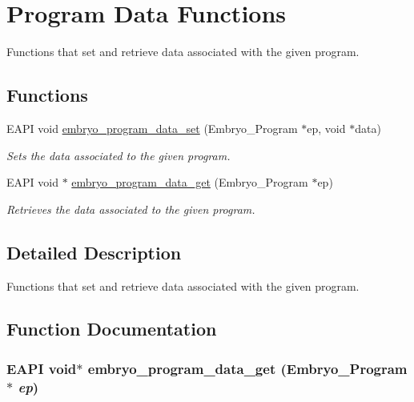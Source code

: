 \hypertarget{group__Embryo__Program__Data__Group}{
\section{Program Data Functions}
\label{group__Embryo__Program__Data__Group}
}
Functions that set and retrieve data associated with the given program.  
\subsection*{Functions}
\begin{CompactItemize}
\item 
EAPI void \hyperlink{group__Embryo__Program__Data__Group_g235c1f64a597073ecc56e560c7e7f0a6}{embryo\_\-program\_\-data\_\-set} (Embryo\_\-Program $\ast$ep, void $\ast$data)
\begin{CompactList}\small\item\em Sets the data associated to the given program. \item\end{CompactList}\item 
EAPI void $\ast$ \hyperlink{group__Embryo__Program__Data__Group_ge792293749ea5ee830f50e3f88fb8dcf}{embryo\_\-program\_\-data\_\-get} (Embryo\_\-Program $\ast$ep)
\begin{CompactList}\small\item\em Retrieves the data associated to the given program. \item\end{CompactList}\end{CompactItemize}


\subsection{Detailed Description}
Functions that set and retrieve data associated with the given program. 



\subsection{Function Documentation}
\hypertarget{group__Embryo__Program__Data__Group_ge792293749ea5ee830f50e3f88fb8dcf}{
\subsubsection{\setlength{\rightskip}{0pt plus 5cm}EAPI void$\ast$ embryo\_\-program\_\-data\_\-get (Embryo\_\-Program $\ast$ {\em ep})}}
\label{group__Embryo__Program__Data__Group_ge792293749ea5ee830f50e3f88fb8dcf}


